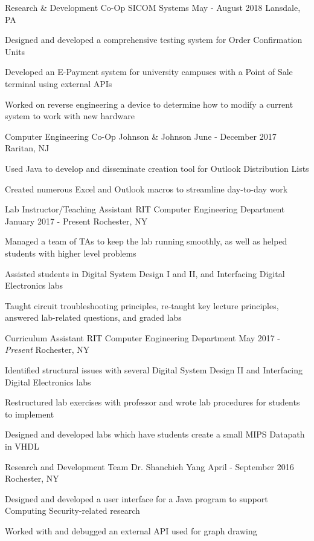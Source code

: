 \begin{cventries}
	\cventry
		{Research \& Development Co-Op}
		{SICOM Systems}
		{May - August 2018}
		{Lansdale, PA}
		{
			\begin{cvitems}
			\item {Designed and developed a comprehensive testing system for Order Confirmation Units}
			\item {Developed an E-Payment system for university campuses with a Point of Sale terminal using external APIs}
			\item {Worked on reverse engineering a device to determine how to modify a current system to work with new hardware}
			\end{cvitems}
		}
	\cventry
		{Computer Engineering Co-Op}
		{Johnson \& Johnson}
		{June - December 2017}
		{Raritan, NJ}
		{
			\begin{cvitems}
			\item {Used Java to develop and disseminate creation tool for Outlook Distribution Lists}
			\item {Created numerous Excel and Outlook macros to streamline day-to-day work}
			\end{cvitems}
		}

	\cventry
		{Lab Instructor/Teaching Assistant}
		{RIT Computer Engineering Department}
		{January 2017 - Present}
		{Rochester, NY}
		{
			\begin{cvitems}
			\item {Managed a team of TAs to keep the lab running smoothly, as well as helped students with higher level problems}
			\item{Assisted students in Digital System Design I and II, and Interfacing Digital Electronics labs}
			\item{Taught circuit troubleshooting principles, re-taught key lecture principles, answered lab-related questions, and graded labs}
			\end{cvitems}
		}

	\cventry
		{Curriculum Assistant}
		{RIT Computer Engineering Department}
		{May 2017 - \textit{Present}}
		{Rochester, NY}
		{
			\begin{cvitems}
			\item {Identified structural issues with several Digital System Design II and Interfacing Digital Electronics labs}
			\item {Restructured lab exercises with professor and wrote lab procedures for students to implement}
			\item {Designed and developed labs which have students create a small MIPS Datapath in VHDL}
			\end{cvitems}
		}

	\cventry
		{Research and Development Team}
		{Dr. Shanchieh Yang}
		{April - September 2016}
		{Rochester, NY}
		{
			\begin{cvitems}
			\item{Designed and developed a user interface for a Java program to support Computing Security-related research}
			\item{Worked with and debugged an external API used for graph drawing}
			\end{cvitems}
		}
\end{cventries}

